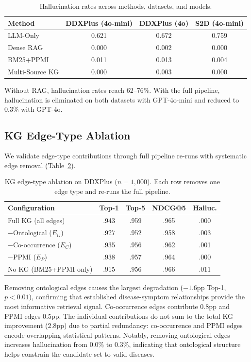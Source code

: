 \documentclass[runningheads]{llncs}
\begin{document}
\begin{table}[t]
\centering
\caption{Hallucination rates across methods, datasets, and models.}
\label{tab:halluc}
\begin{tabular}{lccc}
\toprule
\textbf{Method} & \textbf{DDXPlus (4o-mini)} & \textbf{DDXPlus (4o)} & \textbf{S2D (4o-mini)} \\
\midrule
LLM-Only        & 0.621 & 0.672 & 0.759 \\
Dense RAG        & 0.000 & 0.002 & 0.000 \\
BM25+PPMI        & 0.011 & 0.013 & 0.004 \\
Multi-Source KG  & 0.000 & 0.003 & 0.000 \\
\bottomrule
\end{tabular}
\end{table}

Without RAG, hallucination rates reach 62--76\%. With the full pipeline, hallucination is eliminated on both datasets with GPT-4o-mini and reduced to 0.3\% with GPT-4o.

\subsection{KG Edge-Type Ablation}
\label{sec:edge_ablation}

We validate edge-type contributions through full pipeline re-runs with systematic edge removal (Table~\ref{tab:edge_ablation}).

\begin{table}[t]
\centering
\caption{KG edge-type ablation on DDXPlus ($n{=}1{,}000$). Each row removes one edge type and re-runs the full pipeline.}
\label{tab:edge_ablation}
\begin{tabular}{lcccc}
\toprule
\textbf{Configuration} & \textbf{Top-1} & \textbf{Top-5} & \textbf{NDCG@5} & \textbf{Halluc.} \\
\midrule
Full KG (all edges)      & .943 & .959 & .965 & .000 \\
$-$Ontological ($E_O$)   & .927 & .952 & .958 & .003 \\
$-$Co-occurrence ($E_C$) & .935 & .956 & .962 & .001 \\
$-$PPMI ($E_P$)          & .938 & .957 & .964 & .000 \\
No KG (BM25+PPMI only)   & .915 & .956 & .966 & .011 \\
\bottomrule
\end{tabular}
\end{table}

Removing ontological edges causes the largest degradation ($-1.6$pp Top-1, $p < 0.01$), confirming that established disease-symptom relationships provide the most informative retrieval signal. Co-occurrence edges contribute $0.8$pp and PPMI edges $0.5$pp. The individual contributions do not sum to the total KG improvement (2.8pp) due to partial redundancy: co-occurrence and PPMI edges encode overlapping statistical patterns. Notably, removing ontological edges increases hallucination from 0.0\% to 0.3\%, indicating that ontological structure helps constrain the candidate set to valid diseases.
\end{document}

